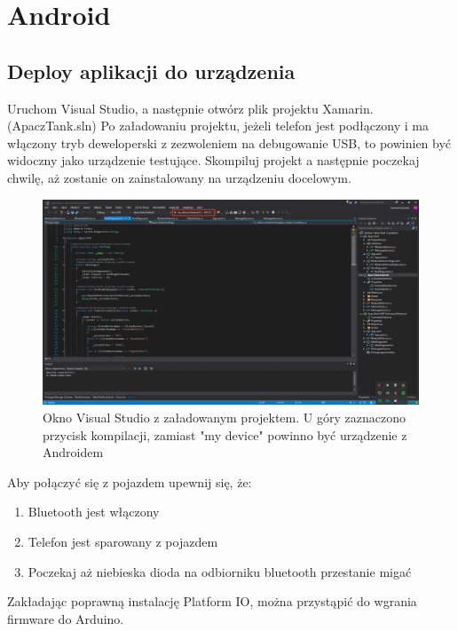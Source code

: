 \documentclass{report}
\begin{document}
        \section{Android}
	        \subsection{Deploy aplikacji do urządzenia}
	        Uruchom Visual Studio, a następnie otwórz plik projektu Xamarin. (ApaczTank.sln) Po załadowaniu projektu, jeżeli telefon jest podłączony i ma włączony tryb deweloperski z zezwoleniem na debugowanie USB, to powinien być widoczny jako urządzenie testujące. Skompiluj projekt a następnie poczekaj chwilę, aż zostanie on zainstalowany na urządzeniu docelowym.
	        \begin{figure}[H]
	        	\centering
	        	\includegraphics[scale=0.25]{visual_2.png}
	        	\caption{Okno Visual Studio z załadowanym projektem. U góry zaznaczono przycisk kompilacji, zamiast "my
	        		 device"  powinno być urządzenie z Androidem}
	        \end{figure}
	        Aby połączyć się z pojazdem upewnij się, że:
	        \begin{enumerate}
	            \item Bluetooth jest włączony
	            \item Telefon jest sparowany z pojazdem 
	            \item Poczekaj aż niebieska dioda na odbiorniku bluetooth przestanie migać
	        \end{enumerate}
	    	Zakładając poprawną instalację Platform IO, można przystąpić do wgrania firmware do Arduino.
\end{document}
